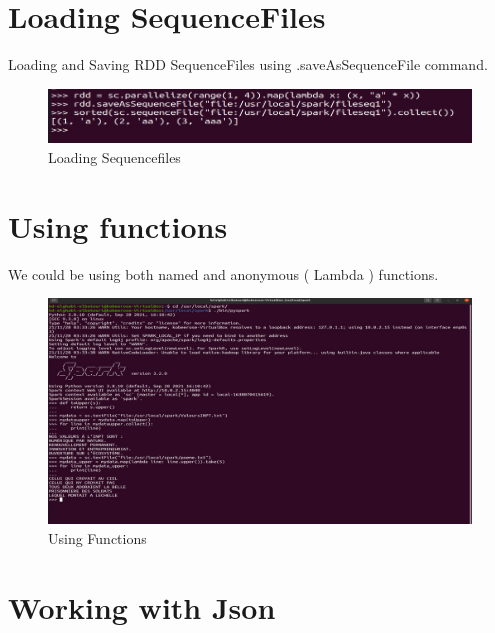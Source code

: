 \begin{spacing}{1.2}
\section{Loading SequenceFiles}

\par Loading and Saving RDD SequenceFiles using .saveAsSequenceFile command.
\\
\begin{figure}[!htb] 
\begin{center} 
\includegraphics[width=1\linewidth]{Big_Data/Spark/Manipulating RDDs using pyspark/Loading Sequencefiles} 
\end{center} 
\caption{Loading Sequencefiles} 
\end{figure} 
\FloatBarrier

\section{Using functions}

\par We could be using both named and anonymous ( Lambda ) functions.
\\
\begin{figure}[!htb] 
\begin{center} 
\includegraphics[width=1\linewidth]{Big_Data/Spark/Manipulating RDDs using pyspark/Using Functions} 
\end{center} 
\caption{Using Functions} 
\end{figure} 
\FloatBarrier

\section{Working with Json}



\end{spacing}
